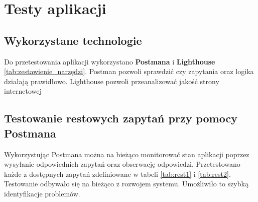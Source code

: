 \chapter{Testy aplikacji}

\section{Wykorzystane technologie}

Do przetestowania aplikacji wykorzystano \textbf{Postmana} i \textbf{Lighthouse} \ref{tab:zestawienie_narzędzi}. Postman pozwoli sprawdzić czy zapytania oraz logika działają prawidłowo. Lighthouse pozwoli przeanalizować jakość strony internetowej


\section{Testowanie restowych zapytań przy pomocy Postmana}
Wykorzystując Postmana można na bieżąco monitorować stan aplikacji poprzez wysyłanie odpowiednich zapytań oraz obserwację odpowiedzi. Przetestowano każde z dostępnych zapytań zdefiniowane w tabeli \ref{tab:rest1} i \ref{tab:rest2}. Testowanie odbywało się na bieżąco z rozwojem systemu. Umożliwiło to szybką identyfikacje problemów.

